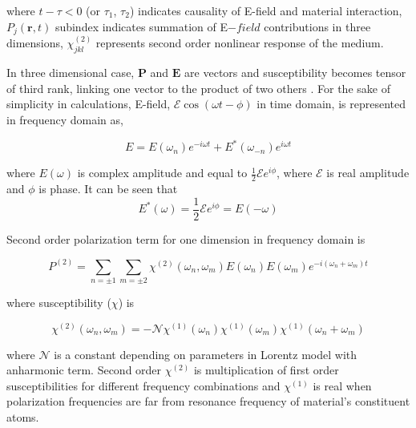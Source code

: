 \documentclass[thesis]{deutez}
\begin{document}
    where $t-\tau<0$ (or $\tau_1$, $\tau_2$)  indicates causality of E-field and material interaction, $P_j(\mathbf{r},t)$ subindex indicates summation of E$-{field}$ contributions in three dimensions,  $\chi_{jkl}^{(2)}$ represents second order nonlinear response of the medium.

    In three dimensional case, $\mathbf{P}$ and $\mathbf{E}$ are vectors and susceptibility becomes tensor of third rank, linking one vector to the product of two others \cite{11}. For the sake of simplicity in calculations, E-field, $\mathcal{E} \cos(\omega t -\phi)$ in time domain, is represented in frequency domain as,

    \begin{equation}
        E = E(\omega_n) e^{-i\omega t} + E^*(\omega_{-n}) e^{i\omega t}
        \label{eq:e-field_freq}
    \end{equation}

    where $E(\omega)$ is complex amplitude and equal to $\frac{1}{2}\mathcal{E}e^{i \phi}$, where $\mathcal{E}$ is real amplitude and $\phi$ is phase. It can be seen that 
    \begin{equation}
        E^*(\omega) = \frac{1}{2}\mathcal{E}e^{i\phi}=E(-\omega)
        \label{eq:complex-identity}
    \end{equation}
    
    Second order polarization term for one dimension in frequency domain is 

    \begin{equation}
        P^{(2)} = \sum_{n=\pm1} \sum_{m=\pm2} \chi^{(2)}(\omega_n,\omega_m)E(\omega_n)E(\omega_m)e^{-i(\omega_n+\omega_m) t}
        \label{eq:nonpol_freq}
    \end{equation}
    
    where susceptibility ($\chi$) is
    
    \begin{equation}
        \chi^{(2)} (\omega_n,\omega_m) = - \mathcal{N} \chi^{(1)} (\omega_n) \chi^{(1)} (\omega_m) \chi^{(1)} (\omega_n+\omega_m)
        \label{eq:chi_decomposition}
    \end{equation}
       
    where $\mathcal{N}$ is a constant depending on parameters in Lorentz model with anharmonic term. Second order $\chi^{(2)}$ is multiplication of first order susceptibilities for different frequency combinations and $\chi^{(1)}$ is real when polarization frequencies are far from resonance frequency of material's constituent atoms.  
\end{document}
